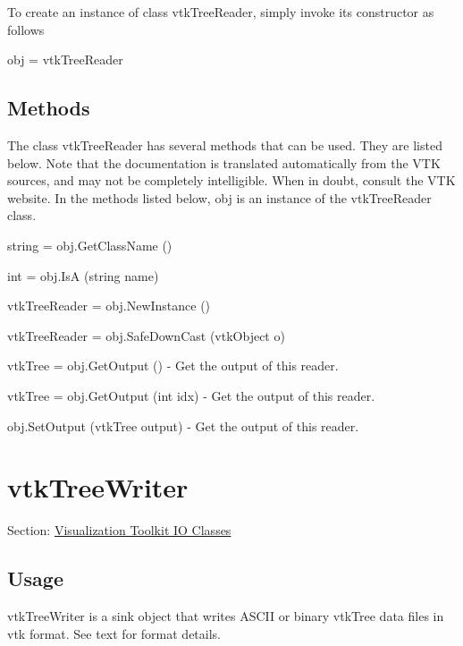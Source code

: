 To create an instance of class vtk\-Tree\-Reader, simply invoke its constructor as follows \begin{DoxyVerb}  obj = vtkTreeReader
\end{DoxyVerb}
 \hypertarget{vtkwidgets_vtkxyplotwidget_Methods}{}\subsection{Methods}\label{vtkwidgets_vtkxyplotwidget_Methods}
The class vtk\-Tree\-Reader has several methods that can be used. They are listed below. Note that the documentation is translated automatically from the V\-T\-K sources, and may not be completely intelligible. When in doubt, consult the V\-T\-K website. In the methods listed below, {\ttfamily obj} is an instance of the vtk\-Tree\-Reader class. 
\begin{DoxyItemize}
\item {\ttfamily string = obj.\-Get\-Class\-Name ()}  
\item {\ttfamily int = obj.\-Is\-A (string name)}  
\item {\ttfamily vtk\-Tree\-Reader = obj.\-New\-Instance ()}  
\item {\ttfamily vtk\-Tree\-Reader = obj.\-Safe\-Down\-Cast (vtk\-Object o)}  
\item {\ttfamily vtk\-Tree = obj.\-Get\-Output ()} -\/ Get the output of this reader.  
\item {\ttfamily vtk\-Tree = obj.\-Get\-Output (int idx)} -\/ Get the output of this reader.  
\item {\ttfamily obj.\-Set\-Output (vtk\-Tree output)} -\/ Get the output of this reader.  
\end{DoxyItemize}\hypertarget{vtkio_vtktreewriter}{}\section{vtk\-Tree\-Writer}\label{vtkio_vtktreewriter}
Section\-: \hyperlink{sec_vtkio}{Visualization Toolkit I\-O Classes} \hypertarget{vtkwidgets_vtkxyplotwidget_Usage}{}\subsection{Usage}\label{vtkwidgets_vtkxyplotwidget_Usage}
vtk\-Tree\-Writer is a sink object that writes A\-S\-C\-I\-I or binary vtk\-Tree data files in vtk format. See text for format details.

